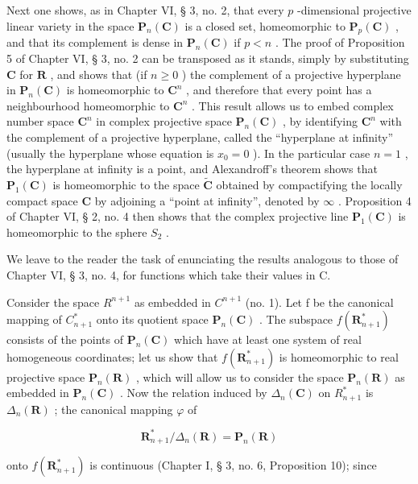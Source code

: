 Next one shows, as in Chapter VI, § 3, no. 2, that every \(p\) -dimensional projective linear variety in the space \(\mathbf{P}_n(\mathbf{C})\) is a closed set, homeomorphic to \(\mathbf{P}_p(\mathbf{C})\) , and that its complement is dense in \(\mathbf{P}_n(\mathbf{C})\) if \(p < n\) . The proof of Proposition 5 of Chapter VI, § 3, no. 2 can be transposed as it stands, simply by substituting \(\mathbf{C}\) for \(\mathbf{R}\) , and shows that (if \(n \geqslant 0\) ) the complement of a projective hyperplane in \(\mathbf{P}_n(\mathbf{C})\) is homeomorphic to \(\mathbf{C}^n\) , and therefore that every point has a neighbourhood homeomorphic to \(\mathbf{C}^n\) . This result allows us to embed complex number space \(\mathbf{C}^n\) in complex projective space \(\mathbf{P}_n(\mathbf{C})\) , by identifying \(\mathbf{C}^n\) with the complement of a projective hyperplane, called the ``hyperplane at infinity'' (usually the hyperplane whose equation is \(x_0 = 0\) ). In the particular case \(n = 1\) , the hyperplane at infinity is a point, and Alexandroff's theorem shows that \(\mathbf{P}_1(\mathbf{C})\) is homeomorphic to the space \(\tilde{\mathbf{C}}\) obtained by compactifying the locally compact space \(\mathbf{C}\) by adjoining a ``point at infinity'', denoted by \(\infty\) . Proposition 4 of Chapter VI, § 2, no. 4 then shows that the complex projective line \(\mathbf{P}_1(\mathbf{C})\) is homeomorphic to the sphere \(S_2\) .

We leave to the reader the task of enunciating the results analogous to those of Chapter VI, § 3, no. 4, for functions which take their values in C.

Consider the space \(R^{n+1}\) as embedded in \(C^{n+1}\) (no. 1). Let f be the canonical mapping of \(C_{n+1}^{*}\) onto its quotient space \(\mathbf{P}_{n}(\mathbf{C})\) . The subspace \(f(\mathbf{R}_{n+1}^{*})\) consists of the points of \(\mathbf{P}_{n}(\mathbf{C})\) which have at least one system of real homogeneous coordinates; let us show that \(f(\mathbf{R}_{n+1}^{*})\) is homeomorphic to real projective space \(\mathbf{P}_{n}(\mathbf{R})\) , which will allow us to consider the space \(\mathbf{P}_{n}(\mathbf{R})\) as embedded in \(\mathbf{P}_{n}(\mathbf{C})\) . Now the relation induced by \(\Delta_{n}(\mathbf{C})\) on \(R_{n+1}^{*}\) is \(\Delta_{n}(\mathbf{R})\) ; the canonical mapping \(\varphi\) of

\[
\mathbf {R} _ {n + 1} ^ {*} / \Delta_ {n} (\mathbf {R}) = \mathbf {P} _ {n} (\mathbf {R})
\]

onto \(f(\mathbf{R}_{n+1}^*)\) is continuous (Chapter I, § 3, no. 6, Proposition 10); since

